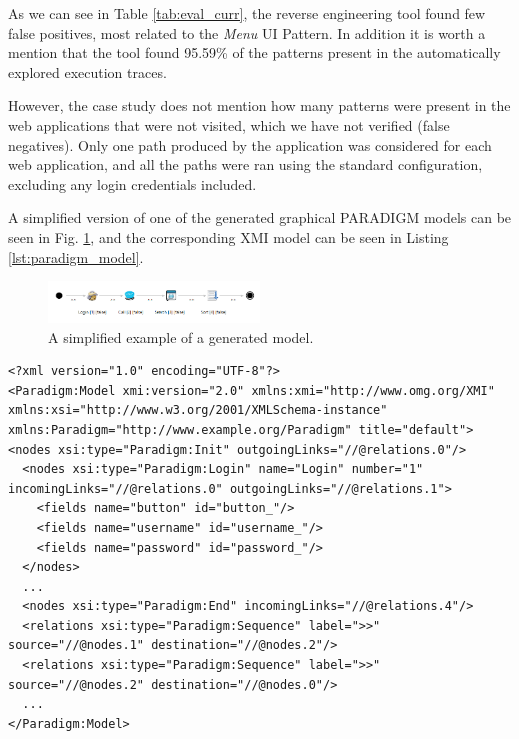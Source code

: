 \documentclass[10pt, conference, compsocconf]{IEEEtran}
\begin{document}
As we can see in Table \ref{tab:eval_curr}, the reverse engineering tool found few false positives, most related to the \textit{Menu} UI Pattern. In addition it is worth a mention that the tool found 95.59\% of the  patterns present in the automatically explored execution traces.

However, the case study does not mention how many patterns were present in the web applications that were not visited, which we have not verified (false negatives). Only one path produced by the application was considered for each web application, and all the paths were ran using the standard configuration, excluding any login credentials included.

A simplified version of one of the generated graphical PARADIGM models can be seen in Fig. \ref{fig:pbgt-me}, and the corresponding XMI model can be seen in Listing \ref{lst:paradigm_model}.

\begin{figure}[!htb]
\centering
\includegraphics[width=0.5\textwidth]{pbgt-me.png}
\caption{A simplified example of a generated model.}
\label{fig:pbgt-me}
\end{figure}

\begin{lstlisting}[float, frame=single, label=lst:paradigm_model, caption={An example of a generated model with identified patterns}]
<?xml version="1.0" encoding="UTF-8"?>
<Paradigm:Model xmi:version="2.0" xmlns:xmi="http://www.omg.org/XMI" xmlns:xsi="http://www.w3.org/2001/XMLSchema-instance" xmlns:Paradigm="http://www.example.org/Paradigm" title="default">
<nodes xsi:type="Paradigm:Init" outgoingLinks="//@relations.0"/>
  <nodes xsi:type="Paradigm:Login" name="Login" number="1" incomingLinks="//@relations.0" outgoingLinks="//@relations.1">
    <fields name="button" id="button_"/>
    <fields name="username" id="username_"/>
    <fields name="password" id="password_"/>
  </nodes>
  ...
  <nodes xsi:type="Paradigm:End" incomingLinks="//@relations.4"/>
  <relations xsi:type="Paradigm:Sequence" label=">>" source="//@nodes.1" destination="//@nodes.2"/>
  <relations xsi:type="Paradigm:Sequence" label=">>" source="//@nodes.2" destination="//@nodes.0"/>
  ...
</Paradigm:Model>
\end{lstlisting}

%  
\end{document}
